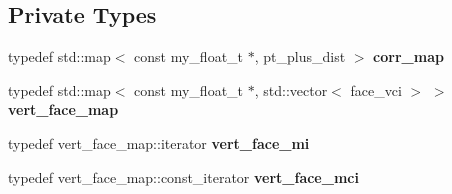\subsection*{Private Types}
\begin{CompactItemize}
\item 
typedef std::map$<$ const my\_\-float\_\-t $\ast$, pt\_\-plus\_\-dist $>$ \textbf{corr\_\-map}\label{classSimSite3D_1_1SimpleTrimesh_34f4df8be6ca27f3e8cd41c636ddbbde}

\item 
typedef std::map$<$ const my\_\-float\_\-t $\ast$, std::vector$<$ face\_\-vci $>$ $>$ \textbf{vert\_\-face\_\-map}\label{classSimSite3D_1_1SimpleTrimesh_00a413368aebdc035ace7e9327937c48}

\item 
typedef vert\_\-face\_\-map::iterator \textbf{vert\_\-face\_\-mi}\label{classSimSite3D_1_1SimpleTrimesh_2fa87e7c069e562d1761244b644fa746}

\item 
typedef vert\_\-face\_\-map::const\_\-iterator \textbf{vert\_\-face\_\-mci}\label{classSimSite3D_1_1SimpleTrimesh_0975a32279b1889f5a04d8d8613b28a6}

\end{CompactItemize}
